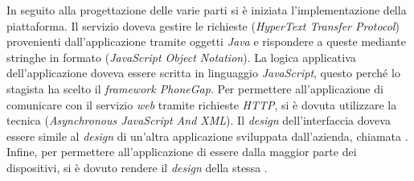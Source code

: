 In seguito alla progettazione delle varie parti si è iniziata l'implementazione della piattaforma. Il servizio doveva gestire le richieste  (\textit{HyperText Transfer Protocol}) provenienti dall'applicazione tramite oggetti  \textit{Java} e rispondere a queste mediante stringhe in formato  (\textit{JavaScript Object Notation}).
La logica applicativa dell'applicazione doveva essere scritta in linguaggio \textit{JavaScript}, questo perché lo stagista ha scelto il \textit{framework PhoneGap}. Per permettere all'applicazione di comunicare con il servizio \textit{web} tramite richieste \textit{HTTP}, si è dovuta utilizzare la tecnica  (\textit{Asynchronous JavaScript And XML}).
Il \textit{design} dell'interfaccia doveva essere simile al \textit{design} di un'altra applicazione sviluppata dall'azienda, chiamata . Infine, per permettere all'applicazione di essere  dalla maggior parte dei dispositivi, si è dovuto rendere il \textit{design} della stessa .

%
%

\endgroup			

\vfill

